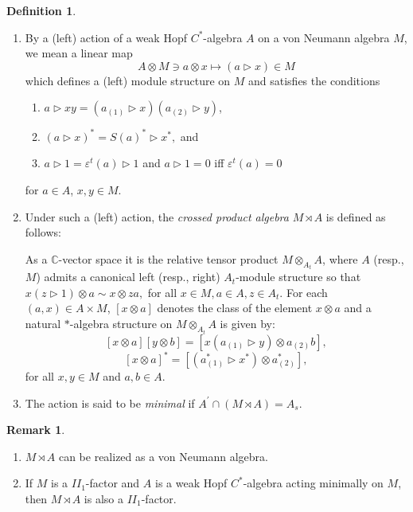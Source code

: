 \documentclass{amsart}
\theoremstyle{definition}
\newtheorem{definition}[theorem]{Definition}
\theoremstyle{theorem}
\newtheorem{remark}[theorem]{Remark}
\newcommand{\C}{\mathbb{C}}
\begin{document}
\begin{definition}
  \begin{enumerate}
    \item By a (left) action of a weak Hopf $C^*$-algebra $A$ on a von
      Neumann algebra $M$, we mean a  linear
      map
      \[
      A\otimes M\ni a\otimes x \mapsto (a\vartriangleright x)\in
      M
      \]
      which defines a (left) module structure on $M$
      and satisfies the conditions
 \begin{enumerate}
  \item $a\vartriangleright xy=(a_{(1)}\vartriangleright x)(a_{(2)}\vartriangleright y)$,
  \item $(a\vartriangleright x)^*=S(a)^*\vartriangleright x^*,$ and
  \item $a\vartriangleright 1=\varepsilon^t(a)\vartriangleright 1$ and $a \vartriangleright 1=0$ iff $\varepsilon^t(a)=0$
  \end{enumerate}
 for $a \in A$, $x, y \in M$.
 
\item  Under such a (left) action, the \textit{crossed product algebra}
  $M\rtimes A$ is defined as follows:

  As a $\C$-vector space it is the relative tensor product
  $M\otimes_{A_t} A$, where $A$ (resp., $M$) admits a canonical left
  (resp., right) $A_t$-module structure so that \( x
  (z\vartriangleright 1)\otimes a \sim  x \otimes za, \) for all
  $x\in M, a\in A,z\in A_t.$ For each $(a, x) \in A \times M$,
  $[x\otimes a]$ denotes the class of the element $x\otimes a$ and a
  natural $*$-algebra structure on $M\otimes_{A_t} A$ is given by:
  \[
    [x\otimes a][y\otimes b]=[x(a_{(1)}\vartriangleright y)\otimes a_{(2)}b],
    \]
    \[
      [x\otimes a]^*=[(a_{(1)}^*\vartriangleright x^*)\otimes
        a_{(2)}^*],\] for all $x,y\in M$ and $a,b\in A$.

\item The action is said to be \textit{minimal} if $A^{\prime}\cap (M\rtimes
  A)=A_s.$
  \end{enumerate}
\end{definition}
  \begin{remark}\cite{NSW, NV1,NV2}
    \begin{enumerate}
\item $M\rtimes A$ can be realized as a von Neumann
      algebra.
 \item If $M$ is a $II_1$-factor and $A$ is a weak Hopf
$C^*$-algebra acting minimally on $M$, then $M \rtimes A$ is also a
$II_1$-factor.
\end{enumerate}
  \end{remark}
  \color{black}
  
\end{document}
